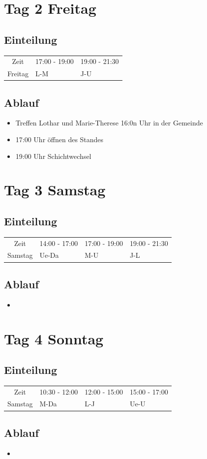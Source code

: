 \documentclass{mybib}
\begin{document}
\section{Tag 2 Freitag}
\subsection{Einteilung}
\begin{center}
\begin{tabular}{ c | l l }
  Zeit & 17:00 - 19:00 & 19:00 - 21:30\\
  Freitag & L-M & J-U
\end{tabular}
\end{center}
\subsection{Ablauf}
\begin{itemize}
  \item Treffen Lothar und Marie-Therese 16:0n Uhr in der Gemeinde
  \item 17:00 Uhr öffnen des Standes
  \item 19:00 Uhr Schichtwechsel
\end{itemize}
\section{Tag 3 Samstag}
\subsection{Einteilung}
\begin{center}
\begin{tabular}{ c | l l l }
  Zeit & 14:00 - 17:00 & 17:00 - 19:00 & 19:00 - 21:30\\
  Samstag & Ue-Da & M-U & J-L
\end{tabular}
\end{center}
\subsection{Ablauf}
\begin{itemize}
  \item 
\end{itemize}
\section{Tag 4 Sonntag}
\subsection{Einteilung}

\begin{tabular}{ c | l l l }
  Zeit & 10:30 - 12:00 & 12:00 - 15:00 & 15:00 - 17:00\\
  Samstag & M-Da & L-J & Ue-U
\end{tabular}

\subsection{Ablauf}
\begin{itemize}
  \item 
\end{itemize}
\end{document}
